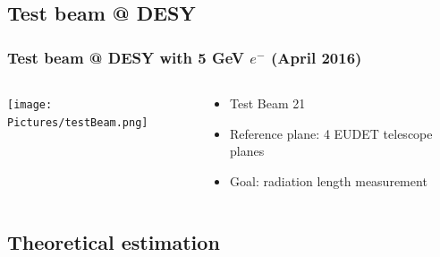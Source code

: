 \documentclass{beamer}
\begin{document}
    \subsection{Test beam @ DESY}

    \begin{frame}
      \frametitle{Test beam @ DESY with 5 GeV $e^-$ (April 2016)}
      
      \begin{columns}[c]
        \begin{column}{5cm}
          \begin{center}
            \texttt{[image: Pictures/testBeam.png]}
          \end{center}
        \end{column}
        \begin{column}{5cm}
          \begin{itemize}
            \item Test Beam 21
            \item Reference plane: 4 EUDET telescope planes
            \item Goal: radiation length measurement
          \end{itemize}
        \end{column}
      \end{columns}
    \end{frame}



    \subsection{Theoretical estimation}
    
\end{document}
